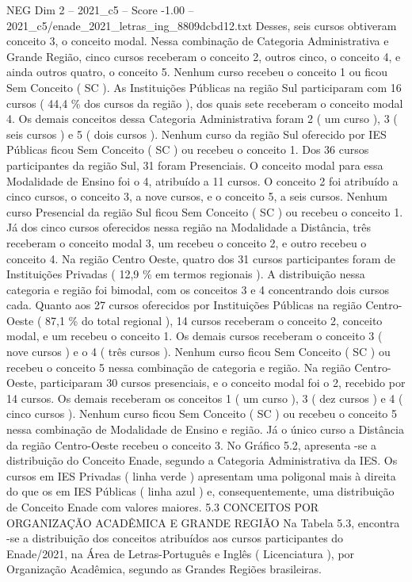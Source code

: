 \begin{textsample}{NEG Dim 2 – 2021\_c5 – Score -1.00 – 2021\_c5/enade\_2021\_letras\_ing\_8809dcbd12.txt}
Desses, seis cursos obtiveram conceito 3, o conceito modal.
Nessa combinação de Categoria Administrativa e Grande Região, cinco cursos receberam o conceito 2, outros cinco, o conceito 4, e ainda outros quatro, o conceito 5.
Nenhum curso recebeu o conceito 1 ou ficou Sem Conceito ( SC ).
As Instituições Públicas na região Sul participaram com 16 cursos ( 44,4 \% dos cursos da região ), dos quais sete receberam o conceito modal 4.
Os demais conceitos dessa Categoria Administrativa foram 2 ( um curso ), 3 ( seis cursos ) e 5 ( dois cursos ).
Nenhum curso da região Sul oferecido por IES Públicas ficou Sem Conceito ( SC ) ou recebeu o conceito 1.
Dos 36 cursos participantes da região Sul, 31 foram Presenciais.
O conceito modal para essa Modalidade de Ensino foi o 4, atribuído a 11 cursos.
O conceito 2 foi atribuído a cinco cursos, o conceito 3, a nove cursos, e o conceito 5, a seis cursos.
Nenhum curso Presencial da região Sul ficou Sem Conceito ( SC ) ou recebeu o conceito 1.
Já dos cinco cursos oferecidos nessa região na Modalidade a Distância, três receberam o conceito modal 3, um recebeu o conceito 2, e outro recebeu o conceito 4.
Na região Centro Oeste, quatro dos 31 cursos participantes foram de Instituições Privadas ( 12,9 \% em termos regionais ).
A distribuição nessa categoria e região foi bimodal, com os conceitos 3 e 4 concentrando dois cursos cada.
Quanto aos 27 cursos oferecidos por Instituições Públicas na região Centro-Oeste ( 87,1 \% do total regional ), 14 cursos receberam o conceito 2, conceito modal, e um recebeu o conceito 1.
Os demais cursos receberam o conceito 3 ( nove cursos ) e o 4 ( três cursos ).
Nenhum curso ficou Sem Conceito ( SC ) ou recebeu o conceito 5 nessa combinação de categoria e região.
Na região Centro-Oeste, participaram 30 cursos presenciais, e o conceito modal foi o 2, recebido por 14 cursos.
Os demais receberam os conceitos 1 ( um curso ), 3 ( dez cursos ) e 4 ( cinco cursos ).
Nenhum curso ficou Sem Conceito ( SC ) ou recebeu o conceito 5 nessa combinação de Modalidade de Ensino e região.
Já o único curso a Distância da região Centro-Oeste recebeu o conceito 3.
No Gráfico 5.2, apresenta -se a distribuição do Conceito Enade, segundo a Categoria Administrativa da IES.
Os cursos em IES Privadas ( linha verde ) apresentam uma poligonal mais à direita do que os em IES Públicas ( linha azul ) e, consequentemente, uma distribuição de Conceito Enade com valores maiores. 5.3 CONCEITOS POR ORGANIZAÇÃO ACADÊMICA E GRANDE REGIÃO Na Tabela 5.3, encontra -se a distribuição dos conceitos atribuídos aos cursos participantes do Enade/2021, na Área de Letras-Português e Inglês ( Licenciatura ), por Organização Acadêmica, segundo as Grandes Regiões brasileiras.

\end{textsample}
